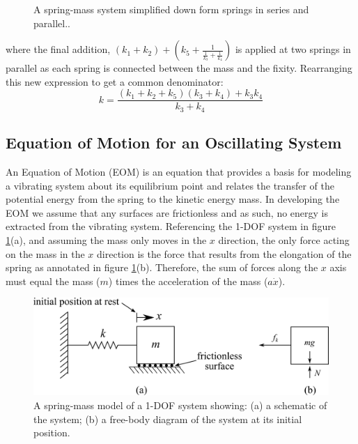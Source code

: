 \documentclass[12pt,letter]{article}
\begin{document}
\begin{example}
\begin{figure}[H]
					\caption{A spring-mass system simplified down form springs in series and parallel..}
				\end{figure}	
				\noindent where the final addition, $(k_1+k_2) + (k_5+\frac{1}{\frac{1}{k_3}+\frac{1}{k_4}})$ is applied at two springs in parallel as each spring is connected between the mass and the fixity. Rearranging this new expression to get a common denominator:
				\begin{equation}
					k= \frac{(k_1+k_2+k_5)(k_3+k_4)+k_3k_4}{k_3+k_4}  
				\end{equation}				
			\end{example}	

					
	\subsection{Equation of Motion for an Oscillating System}			
			
        An Equation of Motion (EOM) is an equation that provides a basis for modeling a vibrating system about its equilibrium point and relates the transfer of the potential energy from the spring to the kinetic energy mass. In developing the EOM we assume that any surfaces are frictionless and as such, no energy is extracted from the vibrating system. Referencing the 1-DOF system in figure \ref{fig:EOM_1-DOF-mass_horizontal}(a), and assuming the mass only moves in the $x$ direction, the only force acting on the mass in the $x$ direction is the force that results from the elongation of the spring as annotated in figure \ref{fig:EOM_1-DOF-mass_horizontal}(b). Therefore, the sum of forces along the $x$ axis must equal the mass ($m$) times the acceleration of the mass ($a\dot{x}$). 

		\begin{figure}[H]
			\centering
			\includegraphics[]{../figures/EOM_1-DOF-mass_horizontal.png}
			\caption{A spring-mass model of a 1-DOF system showing: (a) a schematic of the system; (b) a free-body diagram of the system at its initial position.}
			\label{fig:EOM_1-DOF-mass_horizontal}
		\end{figure}			
		
\end{document}
